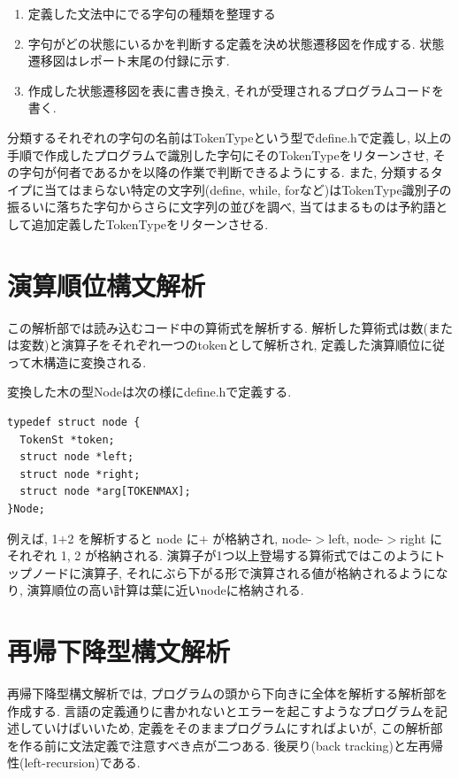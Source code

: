 \documentclass[a4j]{jarticle}
\begin{document}
\begin{enumerate}
\item 定義した文法中にでる字句の種類を整理する
\item 字句がどの状態にいるかを判断する定義を決め状態遷移図を作成する. 状態遷移図はレポート末尾の付録に示す. 
\item 作成した状態遷移図を表に書き換え, それが受理されるプログラムコードを書く. 
\end{enumerate}

分類するそれぞれの字句の名前はTokenTypeという型でdefine.hで定義し, 以上の手順で作成したプログラムで識別した字句にそのTokenTypeをリターンさせ, その字句が何者であるかを以降の作業で判断できるようにする. 
また, 分類するタイプに当てはまらない特定の文字列(define, while, forなど)はTokenType識別子の振るいに落ちた字句からさらに文字列の並びを調べ, 当てはまるものは予約語として追加定義したTokenTypeをリターンさせる. 


\section{演算順位構文解析}
この解析部では読み込むコード中の算術式を解析する. 
解析した算術式は数(または変数)と演算子をそれぞれ一つのtokenとして解析され, 定義した演算順位に従って木構造に変換される. 

変換した木の型Nodeは次の様にdefine.hで定義する. 

\begin{verbatim}
typedef struct node {
  TokenSt *token;              
  struct node *left;
  struct node *right;
  struct node *arg[TOKENMAX];
}Node;
\end{verbatim}

例えば, 1$+$2 を解析すると node に$+$ が格納され, node-$>$left, node-$>$right にそれぞれ 1, 2 が格納される. 
演算子が1つ以上登場する算術式ではこのようにトップノードに演算子, それにぶら下がる形で演算される値が格納されるようになり, 演算順位の高い計算は葉に近いnodeに格納される. 




\section{再帰下降型構文解析}
再帰下降型構文解析では, プログラムの頭から下向きに全体を解析する解析部を作成する. 
言語の定義通りに書かれないとエラーを起こすようなプログラムを記述していけばいいため, 定義をそのままプログラムにすればよいが, この解析部を作る前に文法定義で注意すべき点が二つある. 
後戻り(back tracking)と左再帰性(left-recursion)である. 
\end{document}
